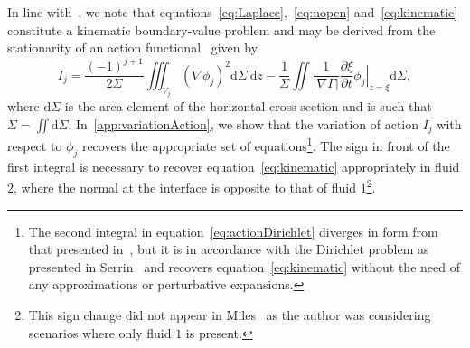 \documentclass[a4paper]{jpconf}
\newcommand{\dd}{\mathrm{d}}
\begin{document}
In line with~\cite{Miles1976NonlinearBasins}, we note that equations~\eqref{eq:Laplace},~\eqref{eq:nopen} and~\eqref{eq:kinematic} constitute a kinematic boundary-value problem and may be derived from the stationarity of an action functional~\cite{serrin1959mathematical} given by
\begin{equation}
    \label{eq:actionDirichlet}
    I_j = \frac{(-1)^{j+1}}{2\Sigma}\iiint_{V_j} \left(\nabla\phi_j\right)^2 \dd\Sigma~\dd z
    -\frac{1}{\Sigma}\iint \frac{1}{|\nabla\Gamma|}\frac{\partial\xi}{\partial t}\left.\phi_j\right|_{z=\xi} \dd\Sigma,
\end{equation}
where $\dd\Sigma$ is the area element of the horizontal cross-section and is such that $\Sigma = \iint\dd\Sigma$. In~\ref{app:variationAction}, we show that the variation of action $I_j$ with respect to $\phi_j$ recovers the appropriate set of equations\footnote{The second integral in equation~\eqref{eq:actionDirichlet} diverges in form from that presented in~\cite{Miles1976NonlinearBasins}, but it is in accordance with the Dirichlet problem as presented in Serrin~\cite{serrin1959mathematical} and recovers equation~\eqref{eq:kinematic} without the need of any approximations or perturbative expansions.}. The sign in front of the first integral is necessary to recover equation~\eqref{eq:kinematic} appropriately in fluid $2$, where the normal at the interface is opposite to that of fluid $1$\footnote{This sign change did not appear in Miles~\cite{Miles1976NonlinearBasins} as the author was considering scenarios where only fluid $1$ is present.}.
\end{document}
